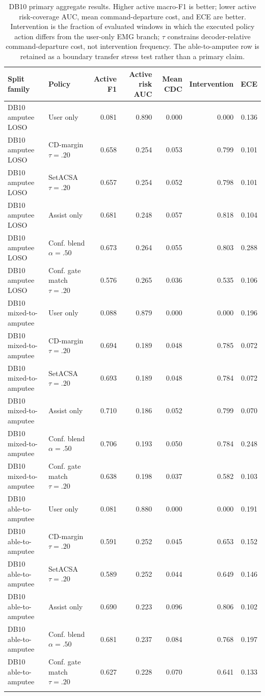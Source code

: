 \begin{table}[!t]
\centering
\caption{DB10 primary aggregate results. Higher active macro-F1 is better; lower active risk-coverage AUC, mean command-departure cost, and ECE are better. Intervention is the fraction of evaluated windows in which the executed policy action differs from the user-only EMG branch; $\tau$ constrains decoder-relative command-departure cost, not intervention frequency. The able-to-amputee row is retained as a boundary transfer stress test rather than a primary claim.}
\label{tab:db10-main}
\footnotesize
\begin{tabular}{llrrrrr}
\toprule
Split family & Policy & Active F1 & Active risk AUC & Mean CDC & Intervention & ECE \\
\midrule
DB10 amputee LOSO & User only & 0.081 & 0.890 & 0.000 & 0.000 & 0.136 \\
DB10 amputee LOSO & CD-margin $\tau=.20$ & 0.658 & 0.254 & 0.053 & 0.799 & 0.101 \\
DB10 amputee LOSO & SetACSA $\tau=.20$ & 0.657 & 0.254 & 0.052 & 0.798 & 0.101 \\
DB10 amputee LOSO & Assist only & 0.681 & 0.248 & 0.057 & 0.818 & 0.104 \\
DB10 amputee LOSO & Conf. blend $\alpha=.50$ & 0.673 & 0.264 & 0.055 & 0.803 & 0.288 \\
DB10 amputee LOSO & Conf. gate match $\tau=.20$ & 0.576 & 0.265 & 0.036 & 0.535 & 0.106 \\
\addlinespace
DB10 mixed-to-amputee & User only & 0.088 & 0.879 & 0.000 & 0.000 & 0.196 \\
DB10 mixed-to-amputee & CD-margin $\tau=.20$ & 0.694 & 0.189 & 0.048 & 0.785 & 0.072 \\
DB10 mixed-to-amputee & SetACSA $\tau=.20$ & 0.693 & 0.189 & 0.048 & 0.784 & 0.072 \\
DB10 mixed-to-amputee & Assist only & 0.710 & 0.186 & 0.052 & 0.799 & 0.070 \\
DB10 mixed-to-amputee & Conf. blend $\alpha=.50$ & 0.706 & 0.193 & 0.050 & 0.784 & 0.248 \\
DB10 mixed-to-amputee & Conf. gate match $\tau=.20$ & 0.638 & 0.198 & 0.037 & 0.582 & 0.103 \\
\addlinespace
DB10 able-to-amputee & User only & 0.081 & 0.880 & 0.000 & 0.000 & 0.191 \\
DB10 able-to-amputee & CD-margin $\tau=.20$ & 0.591 & 0.252 & 0.045 & 0.653 & 0.152 \\
DB10 able-to-amputee & SetACSA $\tau=.20$ & 0.589 & 0.252 & 0.044 & 0.649 & 0.146 \\
DB10 able-to-amputee & Assist only & 0.690 & 0.223 & 0.096 & 0.806 & 0.102 \\
DB10 able-to-amputee & Conf. blend $\alpha=.50$ & 0.681 & 0.237 & 0.084 & 0.768 & 0.197 \\
DB10 able-to-amputee & Conf. gate match $\tau=.20$ & 0.627 & 0.228 & 0.070 & 0.641 & 0.133 \\
\addlinespace
\bottomrule
\end{tabular}
\end{table}

